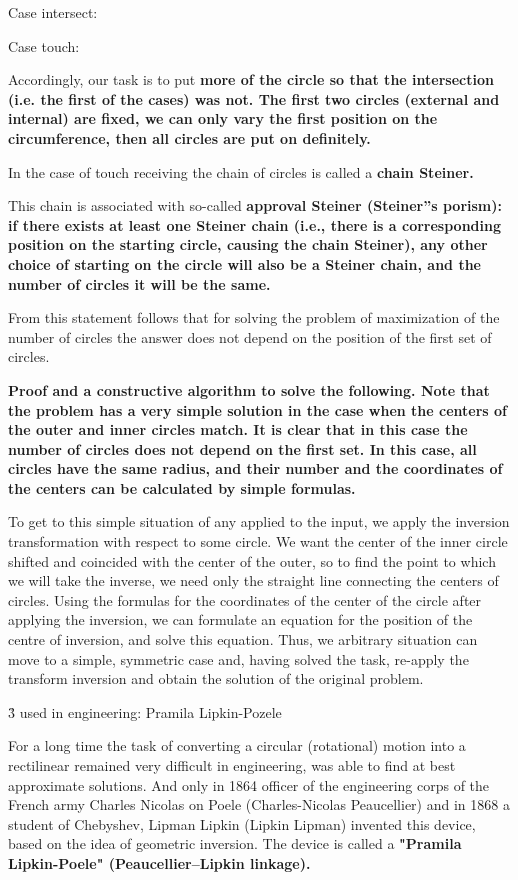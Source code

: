 Case intersect:


Case touch:


Accordingly, our task is to put \bf{more} of the circle so that the intersection (i.e. the first of the cases) was not. The first two circles (external and internal) are fixed, we can only vary the first position on the circumference, then all circles are put on definitely.

In the case of touch receiving the chain of circles is called a \bf{chain Steiner}.

This chain is associated with so-called \bf{approval Steiner} (Steiner''s porism): if there exists at least one Steiner chain (i.e., there is a corresponding position on the starting circle, causing the chain Steiner), any other choice of starting on the circle will also be a Steiner chain, and the number of circles it will be the same.

From this statement follows that for solving the problem of maximization of the number of circles the answer does not depend on the position of the first set of circles.

\bf{Proof} and a constructive algorithm to solve the following. Note that the problem has a very simple solution in the case when the centers of the outer and inner circles match. It is clear that in this case the number of circles does not depend on the first set. In this case, all circles have the same radius, and their number and the coordinates of the centers can be calculated by simple formulas.

To get to this simple situation of any applied to the input, we apply the inversion transformation with respect to some circle. We want the center of the inner circle shifted and coincided with the center of the outer, so to find the point to which we will take the inverse, we need only the straight line connecting the centers of circles. Using the formulas for the coordinates of the center of the circle after applying the inversion, we can formulate an equation for the position of the centre of inversion, and solve this equation. Thus, we arbitrary situation can move to a simple, symmetric case and, having solved the task, re-apply the transform inversion and obtain the solution of the original problem.


\h3{ used in engineering: Pramila Lipkin-Pozele }

For a long time the task of converting a circular (rotational) motion into a rectilinear remained very difficult in engineering, was able to find at best approximate solutions. And only in 1864 officer of the engineering corps of the French army Charles Nicolas on Poele (Charles-Nicolas Peaucellier) and in 1868 a student of Chebyshev, Lipman Lipkin (Lipkin Lipman) invented this device, based on the idea of geometric inversion. The device is called a \bf{"Pramila Lipkin-Poele"} (Peaucellier–Lipkin linkage).

